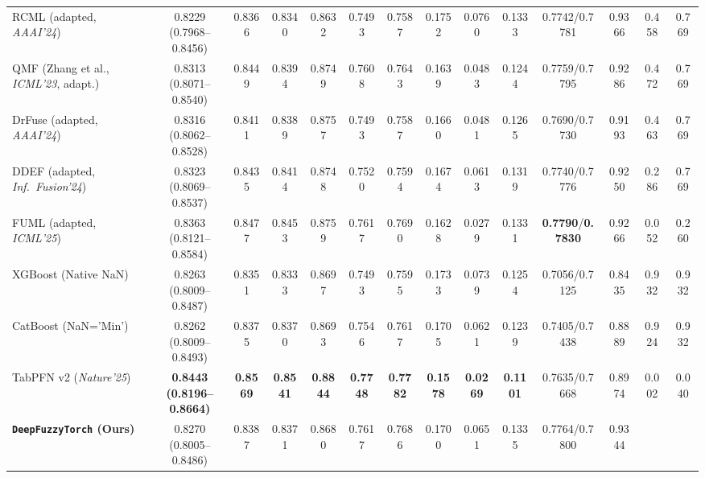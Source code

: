 \documentclass[10pt,twocolumn]{article}
\begin{document}
\begin{table}[t]
{\begin{tabular}{@{}>{\raggedright\arraybackslash}p{4.05cm}ccccccccccccc@{}}
RCML (adapted, \textit{AAAI'24}) \cite{xu2024reliable} & \shortstack{0.8229\\(0.7968--0.8456)}
& 0.8366 & 0.8340 & 0.8632 & 0.7493 & 0.7587 & 0.1752 & 0.0760 & 0.1333 & 0.7742/0.7781 &
0.9366 & 0.458
& 0.769 \\
QMF (Zhang et al., \textit{ICML'23}, adapt.) \cite{zhang2023provable} &
\shortstack{0.8313\\(0.8071--0.8540)} & 0.8449 & 0.8394 & 0.8749 & 0.7608 & 0.7643 &
0.1639 & 0.0483 & 0.1244 & 0.7759/0.7795 & 0.9286 & 0.472 & 0.769 \\
DrFuse (adapted, \textit{AAAI'24}) \cite{yao2024drfuse} &
\shortstack{0.8316\\(0.8062--0.8528)} & 0.8411 & 0.8389 & 0.8757 & 0.7493 &
0.7587 & 0.1660 & 0.0481 & 0.1265 & 0.7690/0.7730 & 0.9193 & 0.463 & 0.769 \\
DDEF (adapted, \textit{Inf.\ Fusion'24}) \cite{shao2024dual} &
\shortstack{0.8323\\(0.8069--0.8537)} & 0.8435 & 0.8414 & 0.8748 & 0.7520 & 0.7594 & 0.1674 &
0.0613 &
0.1319 & 0.7740/0.7776 & 0.9250 & 0.286 & 0.769 \\
FUML (adapted, \textit{ICML'25}) \cite{duan2025fuml} &
\shortstack{0.8363\\(0.8121--0.8584)} & 0.8477 & 0.8453 & 0.8759 & 0.7617 & 0.7690 & 0.1628 &
0.0279 &
0.1331 & \textbf{0.7790}/\textbf{0.7830} & 0.9266 & 0.052 & 0.260 \\
XGBoost (Native NaN) \cite{chen2016xgboost} &
\shortstack{0.8263\\(0.8009--0.8487)} & 0.8351 & 0.8333 & 0.8697 & 0.7493 & 0.7595 & 0.1733 &
0.0739 &
0.1254 & 0.7056/0.7125 & 0.8435 & 0.932 & 0.932 \\
CatBoost (NaN='Min') \cite{prokhorenkova2018catboost} &
\shortstack{0.8262\\(0.8009--0.8493)} & 0.8375 & 0.8370 & 0.8693 & 0.7546 & 0.7617 & 0.1705 &
0.0621 &
0.1239 & 0.7405/0.7438 & 0.8889 & 0.924 & 0.932 \\
TabPFN v2 (\textit{Nature'25}) \cite{hollmann2025tabpfn} &
\shortstack{\textbf{0.8443}\\\textbf{(0.8196--0.8664)}} & \textbf{0.8569} & \textbf{0.8541} &
\textbf{0.8844} & \textbf{0.7748} & \textbf{0.7782} & \textbf{0.1578} & \textbf{0.0269} &
\textbf{0.1101} & 0.7635/0.7668 & 0.8974 & 0.002 & 0.040 \\
\textbf{\texttt{DeepFuzzyTorch} (Ours)} & \shortstack{0.8270\\(0.8005--0.8486)} & 0.8387 &
0.8371 & 0.8680 & 0.7617 & 0.7686 & 0.1700 & 0.0651 & 0.1335 & 0.7764/0.7800 & 0.9344

\end{tabular}}
\end{table}
\end{document}

